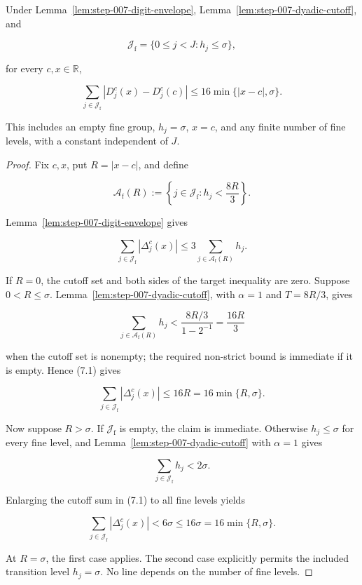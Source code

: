 \begin{proposition}\label{prop:step-007-fine-ledger}
Under Lemma~\ref{lem:step-007-digit-envelope}, Lemma~\ref{lem:step-007-dyadic-cutoff}, and

\[
\mathcal J_{\mathrm f}
=\{0\leq j<J:h_j\leq\sigma\},
\]

for every \(c,x\in\mathbb R\),

\[
\sum_{j\in\mathcal J_{\mathrm f}}
\left|D_j^c(x)-D_j^c(c)\right|
\leq16\min\{|x-c|,\sigma\}.
\]

This includes an empty fine group, \(h_j=\sigma\), \(x=c\), and any finite number of fine levels, with a constant independent of \(J\).
\end{proposition}

\begin{proof}
Fix \(c,x\), put \(R=|x-c|\), and define

\[
\mathcal A_{\mathrm f}(R)
:=\left\{j\in\mathcal J_{\mathrm f}:h_j<\frac{8R}{3}\right\}.
\]

Lemma~\ref{lem:step-007-digit-envelope} gives

\[
\sum_{j\in\mathcal J_{\mathrm f}}|\Delta_j^c(x)|
\leq3\sum_{j\in\mathcal A_{\mathrm f}(R)}h_j.
\tag{7.1}
\]

If \(R=0\), the cutoff set and both sides of the target inequality are zero. Suppose \(0<R\leq\sigma\). Lemma~\ref{lem:step-007-dyadic-cutoff}, with \(\alpha=1\) and \(T=8R/3\), gives

\[
\sum_{j\in\mathcal A_{\mathrm f}(R)}h_j
<\frac{8R/3}{1-2^{-1}}
=\frac{16R}{3}
\]

when the cutoff set is nonempty; the required non-strict bound is immediate if it is empty. Hence (7.1) gives

\[
\sum_{j\in\mathcal J_{\mathrm f}}|\Delta_j^c(x)|
\leq16R
=16\min\{R,\sigma\}.
\]

Now suppose \(R>\sigma\). If \(\mathcal J_{\mathrm f}\) is empty, the claim is immediate. Otherwise \(h_j\leq\sigma\) for every fine level, and Lemma~\ref{lem:step-007-dyadic-cutoff} with \(\alpha=1\) gives

\[
\sum_{j\in\mathcal J_{\mathrm f}}h_j<2\sigma.
\]

Enlarging the cutoff sum in (7.1) to all fine levels yields

\[
\sum_{j\in\mathcal J_{\mathrm f}}|\Delta_j^c(x)|
<6\sigma
\leq16\sigma
=16\min\{R,\sigma\}.
\]

At \(R=\sigma\), the first case applies. The second case explicitly permits the included transition level \(h_j=\sigma\). No line depends on the number of fine levels.
\end{proof}


